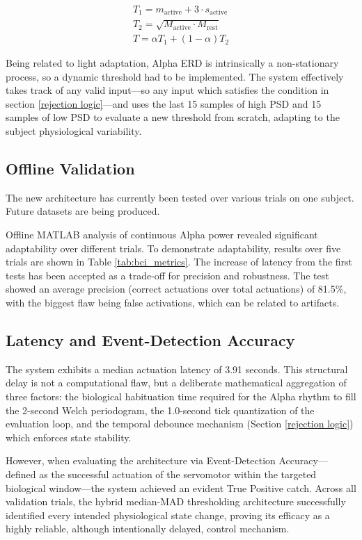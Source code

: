 \documentclass[journal, a4paper]{IEEEtran}
\begin{document}
\begin{gather*}
    T_1 = m_{\text{active}} + 3\cdot s_{\text{active}}\\
    T_2 = \sqrt{M_{\text{active}}\cdot M_{\text{rest}}}\\
    T = \alpha T_1+(1-\alpha)T_2
\end{gather*}

Being related to light adaptation, Alpha ERD is intrinsically a non-stationary process, so a dynamic threshold had to be implemented. The system effectively takes track of any valid input---so any input which satisfies the condition in section \ref{rejection logic}---and uses the last 15 samples of high PSD and 15 samples of low PSD to evaluate a new threshold from scratch, adapting to the subject physiological variability.

\subsection{Offline Validation}
The new architecture has currently been tested over various trials on one subject. Future datasets are being produced.

Offline MATLAB analysis of continuous Alpha power revealed significant adaptability over different trials.
To demonstrate adaptability, results over five trials are shown in Table \ref{tab:bci_metrics}. The increase of latency from the first tests has been accepted as a trade-off for precision and robustness. The test showed an average precision (correct actuations over total actuations) of 81.5\%, with the biggest flaw being false activations, which can be related to artifacts.

\subsection{Latency and Event-Detection Accuracy}

The system exhibits a median actuation latency of 3.91 seconds. This structural delay is not a computational flaw, but a deliberate mathematical aggregation of three factors: the biological habituation time required for the Alpha rhythm to fill the 2-second Welch periodogram, the 1.0-second tick quantization of the evaluation loop, and the temporal debounce mechanism (Section \ref{rejection logic}) which enforces state stability. 

However, when evaluating the architecture via Event-Detection Accuracy—defined as the successful actuation of the servomotor within the targeted biological window—the system achieved an evident True Positive catch. Across all validation trials, the hybrid median-MAD thresholding architecture successfully identified every intended physiological state change, proving its efficacy as a highly reliable, although intentionally delayed, control mechanism.
\end{document}
